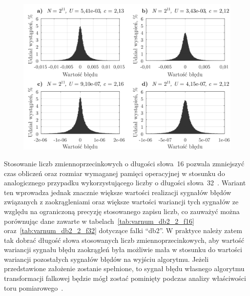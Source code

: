 \begin{figure}[htb!]
\begin{center}
\includegraphics{obrazki/hist_numerr_coif5}
\end{center}
\end{figure}

Stosowanie liczb zmiennoprzecinkowych o długości słowa~\qty{16}{\bitOw} pozwala zmniejszyć czas obliczeń oraz rozmiar wymaganej pamięci operacyjnej w stosunku do analogicznego przypadku wykorzystującego liczby o długości słowa~\qty{32}{\bitOw}~\cite{reay_dsp, gcc_manual}. Wariant ten wprowadza jednak znacznie większe wartości realizacji sygnałów błędów związanych z zaokrągleniami oraz większe wartości wariancji tych sygnałów ze względu na ograniczoną precyzję stosowanego zapisu liczb, co zauważyć można porównując dane zawarte w tabelach~\ref{tab:varnum_db2_2_f16} oraz~\ref{tab:varnum_db2_2_f32} dotyczące falki \enquote{db2}. W praktyce należy zatem tak dobrać długość słowa stosowanych liczb zmiennoprzecinkowych, aby wartość wariancji sygnału błędu zaokrągleń była możliwie mała w stosunku do wartości wariancji pozostałych sygnałów błędów na wyjściu algorytmu. Jeżeli przedstawione założenie zostanie spełnione, to sygnał błędu własnego algorytmu transformacji falkowej będzie mógł zostać pominięty podczas analizy właściwości toru pomiarowego~\cite{jcgm_guide}.

